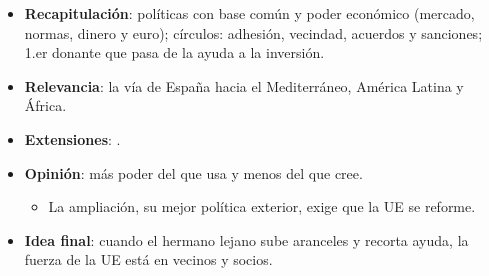 \documentclass{article}
\begin{document}
\begin{columnas}
\begin{itemize}
\item \textbf{Recapitulación}: políticas con base común y poder económico (mercado, normas, dinero y euro); círculos: adhesión, vecindad, acuerdos y sanciones; 1.er donante que pasa de la ayuda a la inversión.
\item \textbf{Relevancia}: la vía de España hacia el Mediterráneo, América Latina y África.
\item \textbf{Extensiones}:     .
\item \textbf{Opinión}: más poder del que usa y menos del que cree.
  \begin{itemize}
  \item La ampliación, su mejor política exterior, exige que la UE se reforme.
  \end{itemize}
\item \textbf{Idea final}: cuando el hermano lejano sube aranceles y recorta ayuda, la fuerza de la UE está en vecinos y socios.
\end{itemize}


\end{columnas}
\end{document}
